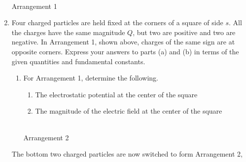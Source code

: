 \documentclass{../../../oss-apphys}
\begin{document}
\begin{enumerate}
  \begin{center}
    \\
    Arrangement 1
  \end{center}
  
\item Four charged particles are held fixed at the corners of a square of
  side $s$. All the charges have the same magnitude $Q$, but two are positive
  and two are negative. In Arrangement 1, shown above, charges of the same
  sign are at opposite corners. Express your answers to parts (a) and (b) in
  terms of the given quantities and fundamental constants.
  \begin{enumerate}[leftmargin=15pt]
  \item For Arrangement 1, determine the following.
    \begin{enumerate}
    \item The electrostatic potential at the center of the square
    \item The magnitude of the electric field at the center of the square
    \end{enumerate}
    \begin{center}
      \\
      Arrangement 2
    \end{center}
  \end{enumerate}  
  The bottom two charged particles are now switched to form Arrangement 2,

\end{enumerate}
\end{document}
